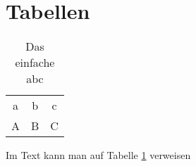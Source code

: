 \section{Tabellen}

\begin{table}[h]
    \begin{tabular}{ccc}
        a & b & c \\
        A & B & C
    \end{tabular}
    \caption{Das einfache abc}
    \label{tab:abc}
\end{table}

Im Text kann man auf Tabelle \ref{tab:abc} verweisen

\blindtext

\newpage